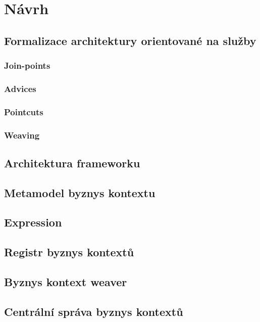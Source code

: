 \usepackage[T1]{fontenc}
\usepackage[utf8]{inputenc}


\chapter{Návrh}\label{ch:navrh}

\section{Formalizace architektury orientované na služby}

\subsection{Join-points}

\subsection{Advices}

\subsection{Pointcuts}

\subsection{Weaving}

\section{Architektura frameworku}

\section{Metamodel byznys kontextu}\label{sec:metamodel}

\section{Expression}

\section{Registr byznys kontextů}

\section{Byznys kontext weaver}

\section{Centrální správa byznys kontextů}
